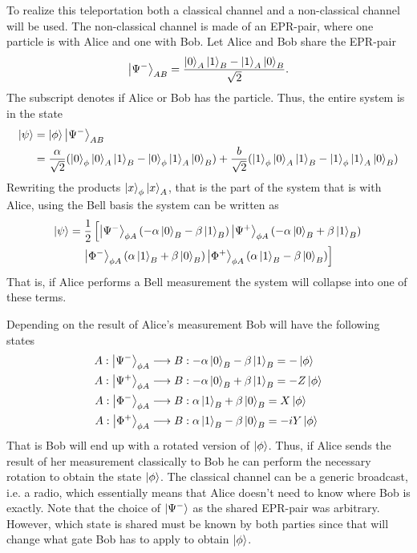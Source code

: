 To realize this teleportation both a classical channel and a non-classical channel will be used. The non-classical channel is made of an EPR-pair, where one particle is with Alice and one with Bob. Let Alice and Bob share the EPR-pair 
\begin{equation}
    \ket{\Psi^-}_{AB} = \frac{\ket{0}_A\ket{1}_B - \ket{1}_A\ket{0}_B}{\sqrt{2}}.
\end{equation}
The subscript denotes if Alice or Bob has the particle. Thus, the entire system is in the state 
\begin{align}
    \ket{\psi} &=\ket{\phi}\ket{\Psi^-}_{AB} \\ &= \frac{\alpha}{\sqrt{2}} (\ket{0}_\phi \ket{0}_A \ket{1}_B - \ket{0}_\phi \ket{1}_A \ket{0}_B) + \frac{b}{\sqrt{2}} (\ket{1}_\phi \ket{0}_A \ket{1}_B - \ket{1}_\phi \ket{1}_A \ket{0}_B)
\end{align}
Rewriting the products $\ket{x}_\phi\ket{x}_A$, that is the part of the system that is with Alice, using the Bell basis the system can be written as 
\begin{multline}
    \ket{\psi} = \frac{1}{2}\left[
        \ket{\Psi^-}_{\phi A} (-\alpha\ket{0}_B - \beta\ket{1}_B)   
        \ket{\Psi^+}_{\phi A} (-\alpha\ket{0}_B + \beta\ket{1}_B)\right.\\
        \left.\ket{\Phi^-}_{\phi A} (\alpha\ket{1}_B + \beta\ket{0}_B)
        \ket{\Phi^+}_{\phi A} (\alpha\ket{1}_B - \beta\ket{0}_B)
        \right]  
\end{multline}
That is, if Alice performs a Bell measurement the system will collapse into one of these terms. \cite{Bennett:1993}

Depending on the result of Alice's measurement Bob will have the following states
\begin{align}
    A: \ket{\Psi^-}_{\phi A} &\longrightarrow B: -\alpha\ket{0}_B - \beta \ket{1}_B = -\ket{\phi}\\
    A: \ket{\Psi^+}_{\phi A} &\longrightarrow B: -\alpha\ket{0}_B + \beta \ket{1}_B = -Z\ket{\phi}\\
    A: \ket{\Phi^-}_{\phi A} &\longrightarrow B: \alpha\ket{1}_B + \beta \ket{0}_B = X\ket{\phi}\\
    A: \ket{\Phi^+}_{\phi A} &\longrightarrow B: \alpha\ket{1}_B - \beta \ket{0}_B = -iY\ket{\phi}\\
\end{align}
That is Bob will end up with a rotated version of $\ket{\phi}$. Thus, if Alice sends the result of her measurement classically to Bob he can perform the necessary rotation to obtain the state $\ket{\phi}$. The classical channel can be a generic broadcast, i.e. a radio, which essentially means that Alice doesn't need to know where Bob is exactly. Note that the choice of $\ket{\Psi^-}$ as the shared EPR-pair was arbitrary. However, which state is shared must be known by both parties since that will change what gate Bob has to apply to obtain $\ket{\phi}$. \cite{Bennett:1993}